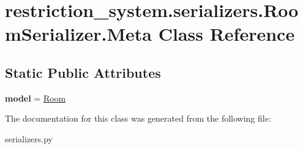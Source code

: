 \hypertarget{classrestriction__system_1_1serializers_1_1RoomSerializer_1_1Meta}{}\section{restriction\+\_\+system.\+serializers.\+Room\+Serializer.\+Meta Class Reference}
\label{classrestriction__system_1_1serializers_1_1RoomSerializer_1_1Meta}
\subsection*{Static Public Attributes}
\begin{DoxyCompactItemize}
\item 
\hypertarget{classrestriction__system_1_1serializers_1_1RoomSerializer_1_1Meta_ab134d752a6ce8de63eade694a0042fdb}{}{\bfseries model} = \hyperlink{classrestriction__system_1_1models_1_1Room}{Room}\label{classrestriction__system_1_1serializers_1_1RoomSerializer_1_1Meta_ab134d752a6ce8de63eade694a0042fdb}

\end{DoxyCompactItemize}


The documentation for this class was generated from the following file\+:\begin{DoxyCompactItemize}
\item 
serializers.\+py\end{DoxyCompactItemize}
